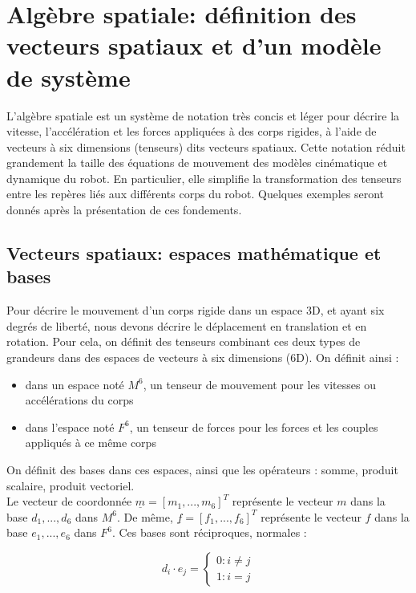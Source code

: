 \documentclass{report}
\begin{document}
\section{Algèbre spatiale: définition des vecteurs spatiaux et d'un modèle de système}

L'algèbre spatiale est un système de notation très concis et léger pour décrire la vitesse, l'accélération et les forces appliquées à des corps rigides, à l'aide de vecteurs à six dimensions (tenseurs) dits vecteurs spatiaux. Cette notation réduit grandement la taille des équations de mouvement des modèles cinématique et dynamique du robot. En particulier, elle simplifie la transformation des tenseurs entre les repères liés aux différents corps du robot. Quelques exemples seront donnés après la présentation de ces fondements.\\


\subsection{Vecteurs spatiaux: espaces mathématique et bases}

Pour décrire le mouvement d'un corps rigide dans un espace 3D, et ayant six degrés de liberté, nous devons décrire le déplacement en translation et en rotation. Pour cela, on définit des tenseurs combinant ces deux types de grandeurs dans des espaces de vecteurs à six dimensions (6D). On définit ainsi :\\
\begin{itemize}
\item dans un espace noté $M^{6}$, un tenseur de mouvement pour les vitesses ou accélérations du corps
\item dans l'espace noté $F^{6}$, un tenseur de forces pour les forces et les couples appliqués à ce même corps
\end{itemize}
On définit des bases dans ces espaces, ainsi que les opérateurs : somme, produit scalaire, produit vectoriel.\\
Le vecteur de coordonnée $\underline{m}=[m_{1},...,m_{6}]^T$ représente le vecteur $m$ dans la base ${d_{1},...,d_{6}}$ dans $M^{6}$.
De même, $\underline{f}=[f_{1},...,f_{6}]^T$ représente le vecteur $f$ dans la base ${e_{1},...,e_{6}}$ dans $F^{6}$.
Ces bases sont réciproques, normales :

$$
d_{i}\cdot e_{j}=
\begin{cases}
0 \colon i \neq j\\
1 \colon i = j
\end{cases}
$$
\end{document}
